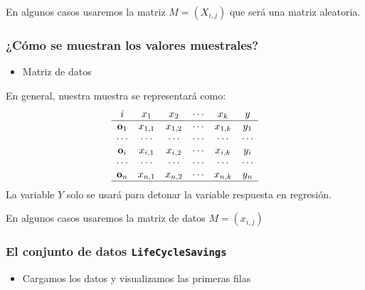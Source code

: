 En algunos casos usaremos la matriz $M=(X_{i,j})$ que será una matriz aleatoria.
\subsubsection{¿Cómo se muestran los valores muestrales?}

\begin{figure}
\end{figure}

\begin{itemize}[label=\color{red}\textbullet, leftmargin=*]
	\item \color{lightblue}Matriz de datos
\end{itemize}

En general, nuestra muestra se representará como: 
\[ \begin{array}{cccccc}
i & x_1 & x_2 & \cdots & x_k & y \\ \hline
\mathbf{o}_1 & x_{1,1} & x_{1,2} & \cdots & x_{1,k} & y_1 \\
\cdots & \cdots & \cdots & \cdots & \cdots & \cdots \\
\mathbf{o}_i & x_{i,1} & x_{i,2} & \cdots & x_{i,k} & y_i \\
\cdots & \cdots & \cdots & \cdots & \cdots & \cdots \\
\mathbf{o}_n & x_{n,1} & x_{n,2} & \cdots & x_{n,k} & y_n \\ \hline
\end{array} \]
La variable $Y$ solo se usará para detonar la variable respuesta en regresión.

En algunos casos usaremos la matriz de datos $M=(x_{i,j})$

\subsubsection{El conjunto de datos \textbf{\texttt{LifeCycleSavings}}}

\begin{itemize}[label=\color{red}\textbullet, leftmargin=*]
	\item \color{lightblue}Cargamos los datos y visualizamos las primeras filas
\end{itemize}

